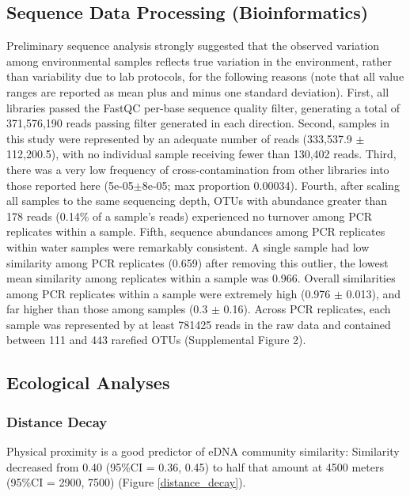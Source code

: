 \documentclass[11pt,letterpaper]{article} %
\begin{document}
\subsection*{Sequence Data Processing (Bioinformatics)}
Preliminary sequence analysis strongly suggested that the observed variation among environmental samples reflects true variation in the environment, rather than variability due to lab protocols, for the following reasons (note that all value ranges are reported as mean plus and minus one standard deviation). First, all libraries passed the FastQC per-base sequence quality filter, generating a total of 371,576,190 reads passing filter generated in each direction. Second, samples in this study were represented by an adequate number of reads (333,537.9 $\pm$ 112,200.5), with no individual sample receiving fewer than 130,402 reads. Third, there was a very low frequency of cross-contamination from other libraries into those reported here (5e-05$\pm$8e-05; max proportion 0.00034). Fourth, after scaling all samples to the same sequencing depth, OTUs with abundance greater than 178 reads (0.14\% of a sample's reads) experienced no turnover among PCR replicates within a sample. Fifth, sequence abundances among PCR replicates within water samples were remarkably consistent. A single sample had low similarity among PCR replicates (0.659) after removing this outlier, the lowest mean similarity among replicates within a sample was 0.966. Overall similarities among PCR replicates within a sample were extremely high (0.976 $\pm$ 0.013), and far higher than those among samples (0.3 $\pm$ 0.16).
Across PCR replicates, each sample was represented by at least 781425 reads in the raw data and contained between 111 and 443 rarefied OTUs (Supplemental Figure 2).


\subsection*{Ecological Analyses}
\subsubsection*{Distance Decay}
Physical proximity is a good predictor of eDNA community similarity: Similarity decreased from 0.40 (95\%CI = 0.36, 0.45) to half that amount at 4500 meters (95\%CI = 2900, 7500) (Figure \ref{distance_decay}).
\end{document}
